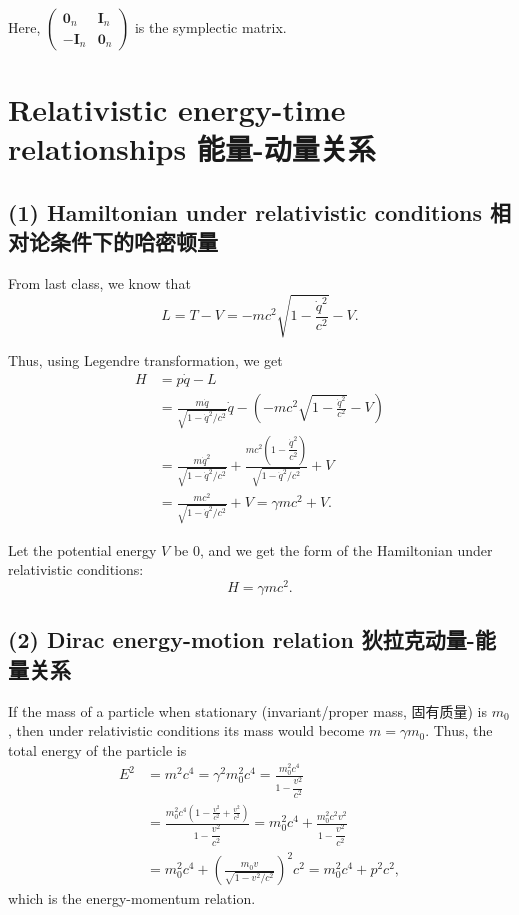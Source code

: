 Here, $\begin{pmatrix}
        \mathbf{0}_n & \mathbf{I}_n \\
        - \mathbf{I}_n & \mathbf{0}_n
    \end{pmatrix}$ is the symplectic matrix.

\section{Relativistic energy-time relationships
能量-动量关系}\label{relativistic-energy-time-relationships-ux80fdux91cf-ux52a8ux91cfux5173ux7cfb}

\subsection*{(1) Hamiltonian under relativistic conditions
相对论条件下的哈密顿量}\label{hamiltonian-under-relativistic-conditions-ux76f8ux5bf9ux8bbaux6761ux4ef6ux4e0bux7684ux54c8ux5bc6ux987fux91cf}

From last class, we know that
\[L = T - V = - mc^2 \sqrt{1 - \frac{\dot{q}^2}{c^2}} - V.\]

Thus, using Legendre transformation, we get \begin{align*}
    H & = p \dot{q} - L \\
    & = \frac{m \dot{q}}{\sqrt{1 - \dot{q}^2 / c^2}} \dot{q} - \left( - mc^2 \sqrt{1 - \frac{\dot{q}^2}{c^2}} - V \right) \\
    & = \frac{m \dot{q}^2}{\sqrt{1 - \dot{q}^2 / c^2}} + \frac{mc^2 \left( 1 - \dfrac{\dot{q}^2}{c^2} \right)}{\sqrt{1 - \dot{q}^2 / c^2}} + V \\
    & = \frac{m c^2}{\sqrt{1 - \dot{q}^2 / c^2}} + V = \gamma mc^2 + V.
\end{align*}

Let the potential energy \(V\) be \(0\), and we get the form of the
Hamiltonian under relativistic conditions: \[H = \gamma mc^2.\]

\subsection*{(2) Dirac energy-motion relation
狄拉克动量-能量关系}\label{dirac-energy-motion-relation-ux72c4ux62c9ux514bux52a8ux91cf-ux80fdux91cfux5173ux7cfb}

If the mass of a particle when stationary (invariant/proper mass,
固有质量) is \(m_0\), then under relativistic conditions its mass would
become \(m = \gamma m_0\). Thus, the total energy of the particle is
\begin{align*}
    E^2 & = m^2 c^4 = \gamma^2 m_0^2 c^4 = \frac{m_0^2 c^4}{1 - \dfrac{v^2}{c^2}} \\
    & = \frac{\displaystyle m_0^2 c^4 \left( 1 - \frac{v^2}{c^2} + \frac{v^2}{c^2} \right)}{1 - \dfrac{v^2}{c^2}} = m_0^2 c^4 + \frac{m_0^2 c^2 v^2}{1 - \dfrac{v^2}{c^2}} \\
    & = m_0^2 c^4 + \left( \frac{m_0 v}{\sqrt{1 - v^2 / c^2}} \right)^2 c^2 = m_0^2 c^4 + p^2 c^2,
\end{align*} which is the energy-momentum relation.

